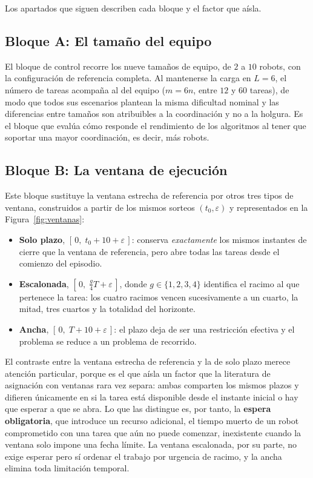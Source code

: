 Los apartados que siguen describen cada bloque y el factor que aísla.

\subsection{Bloque A: El tamaño del equipo} \label{subsec:casos-bloqueA}
El bloque de control recorre los nueve tamaños de equipo, de $2$ a $10$ robots, con la configuración de referencia completa. Al mantenerse la carga en $L=6$, el número de tareas acompaña al del equipo ($m=6n$, entre $12$ y $60$ tareas), de modo que todos sus escenarios plantean la misma dificultad nominal y las diferencias entre tamaños son atribuibles a la coordinación y no a la holgura. Es el bloque que evalúa cómo responde el rendimiento de los algoritmos al tener que soportar una mayor coordinación, es decir, más robots.

\subsection{Bloque B: La ventana de ejecución} \label{subsec:casos-bloqueB}
Este bloque sustituye la ventana estrecha de referencia por otros tres tipos de ventana, construidos a partir de los mismos sorteos $(t_0,\varepsilon)$ y representados en la Figura~\ref{fig:ventanas}:
\begin{itemize}
    \item \textbf{Solo plazo}, $[\,0,\;t_0+10+\varepsilon\,]$: conserva \emph{exactamente} los mismos instantes de cierre que la ventana de referencia, pero abre todas las tareas desde el comienzo del episodio.
    \item \textbf{Escalonada}, $[\,0,\;\tfrac{g}{4}T+\varepsilon\,]$, donde $g \in \{ 1, 2, 3, 4\}$ identifica el racimo al que pertenece la tarea: los cuatro racimos vencen sucesivamente a un cuarto, la mitad, tres cuartos y la totalidad del horizonte.
    \item \textbf{Ancha}, $[\,0,\;T+10+\varepsilon\,]$: el plazo deja de ser una restricción efectiva y el problema se reduce a un problema de recorrido.
\end{itemize}
El contraste entre la ventana estrecha de referencia y la de solo plazo merece atención particular, porque es el que aísla un factor que la literatura de asignación con ventanas rara vez separa: ambas comparten los mismos plazos y difieren únicamente en si la tarea está disponible desde el instante inicial o hay que esperar a que se abra. Lo que las distingue es, por tanto, la \textbf{espera obligatoria}, que introduce un recurso adicional, el tiempo muerto de un robot comprometido con una tarea que aún no puede comenzar, inexistente cuando la ventana solo impone una fecha límite. La ventana escalonada, por su parte, no exige esperar pero sí ordenar el trabajo por urgencia de racimo, y la ancha elimina toda limitación temporal.

